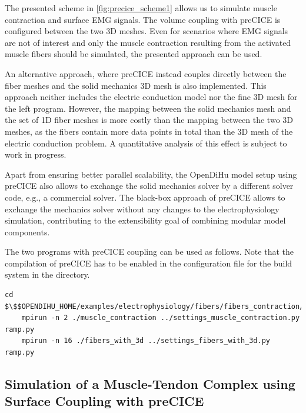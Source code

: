 The presented scheme in \cref{fig:precice_scheme1} allows us to simulate muscle contraction and surface EMG signals. The volume coupling with preCICE is configured between the two 3D meshes. Even for scenarios where EMG signals are not of interest and only the muscle contraction resulting from the activated muscle fibers should be simulated, the presented approach can be used.

An alternative approach, where preCICE instead couples directly between the fiber meshes and the solid mechanics 3D mesh is also implemented. This approach neither includes the electric conduction model nor the fine 3D mesh for the left program.
However, the mapping between the solid mechanics mesh and the set of 1D fiber meshes is more costly than the mapping between the two 3D meshes, as the fibers contain more data points in total than the 3D mesh of the electric conduction problem. A quantitative analysis of this effect is subject to work in progress.

Apart from ensuring better parallel scalability, the OpenDiHu model setup using preCICE also allows to exchange the solid mechanics solver by a different solver code, e.g., a commercial solver. The black-box approach of preCICE allows to exchange the mechanics solver without any changes to the electrophysiology simulation, contributing to the extensibility goal of combining modular model components.

\begin{reproduce_no_break}
  The two programs with preCICE coupling can be used as follows. Note that the compilation of preCICE has to be enabled in the  configuration file for the  build system in the  directory.
  \begin{lstlisting}[columns=fullflexible,breaklines=true,postbreak=\mbox{\textcolor{gray}{$\hookrightarrow$}\space}]
    cd $\$$OPENDIHU_HOME/examples/electrophysiology/fibers/fibers_contraction/with_precice_volume_coupling/build_release
    mpirun -n 2 ./muscle_contraction ../settings_muscle_contraction.py ramp.py
    mpirun -n 16 ./fibers_with_3d ../settings_fibers_with_3d.py ramp.py
  \end{lstlisting}
\end{reproduce_no_break}

\subsection{Simulation of a Muscle-Tendon Complex using Surface Coupling with preCICE}\label{sec:surface_coupling_contraction}

